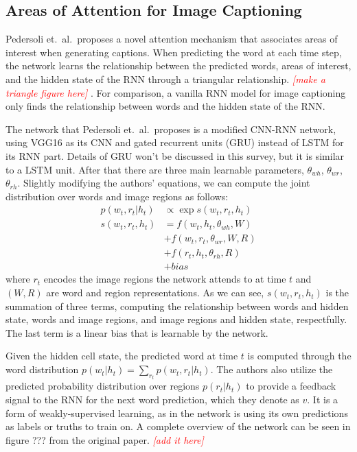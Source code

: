 \documentclass[10pt,twocolumn,letterpaper]{article}
\newcommand{\todo}[1]{\textcolor{red}{{\em [#1]}} }
\begin{document}
\subsection{Areas of Attention for Image Captioning}

Pedersoli et.\ al.\ proposes a novel attention mechanism that associates
areas of interest when generating captions. When predicting the word at each
time step, the network learns the relationship between the predicted words,
areas of interest, and the hidden state of the RNN through a triangular
relationship. \todo{make a triangle figure here}. For comparison, a vanilla
RNN model for image captioning only finds the relationship between words and
the hidden state of the RNN.

The network that Pedersoli et.\ al.\ proposes is a modified CNN-RNN network,
using VGG16 as its CNN and gated recurrent units (GRU) instead of LSTM for its
RNN part. Details of GRU won't be discussed in this survey, but it is similar
to a LSTM unit. After that there are three main learnable parameters,
$\theta_{wh}$, $\theta_{wr}$, $\theta_{rh}$. Slightly modifying the authors'
equations, we can compute the joint distribution over words and image regions
as follows:
%
\begin{equation}
  \begin{aligned}
    p(w_t, r_t|h_t) &\propto \exp s(w_t, r_t, h_t) \\
    s(w_t, r_t, h_t) &= f(w_t, h_t, \theta_{wh}, W) \\
                     &+ f(w_t, r_t, \theta_{wr}, W, R) \\
                     &+ f(r_t, h_t, \theta_{rh}, R) \\
                     &+ bias
  \end{aligned}
\end{equation}
%
where $r_t$ encodes the image regions the network attends to at time $t$ and
$(W,R)$ are word and region representations. As we can see, $s(w_t, r_t, h_t)$
is the summation of three terms, computing the relationship between words and
hidden state, words and image regions, and image regions and hidden state,
respectfully. The last term is a linear bias that is learnable by the network.

Given the hidden cell state, the predicted word at time $t$ is computed
through the word distribution $p(w_t|h_t) = \sum_{r_t} p(w_t,r_t|h_t)$. The
authors also utilize the predicted probability distribution over regions
$p(r_t|h_t)$ to provide a feedback signal to the RNN for the next word
prediction, which they denote as $v$. It is a form of weakly-supervised
learning, as in the network is using its own predictions as labels or truths
to train on. A complete overview of the network can be seen in figure ??? from
the original paper. \todo{add it here}
\end{document}

